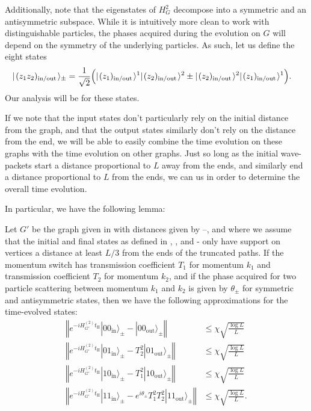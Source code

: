 \documentclass[../thesis-main/thesis-main]{subfiles}
\begin{document}
Additionally, note that the eigenstates of $H_G^2$ decompose into a symmetric and an antisymmetric subspace.  While it is intuitively more clean to work with distinguishable particles, the phases acquired during the evolution on $G$ will depend on the symmetry of the underlying particles.  As such, let us define the eight states
\begin{align}
  |\mspace{2mu} (z_1z_2)_{\text{in/out}} \mspace{2mu} \rangle_{\pm} &= \frac{1}{\sqrt{2} }\Big(|\mspace{2mu} (z_1)_{\text{in/out}} \mspace{2mu} \rangle^1 |\mspace{2mu} (z_{2})_{\text{in/out}} \mspace{2mu} \rangle^2 \pm |\mspace{2mu} (z_{2})_{\text{in/out}} \mspace{2mu} \rangle^2|\mspace{2mu} (z_1)_{\text{in/out}} \mspace{2mu} \rangle^1 \Big).
\end{align}
Our analysis will be for these states.

If we note that the input states don't particularly rely on the initial distance from the graph, and that the output states similarly don't rely on the distance from the end, we will be able to easily combine the time evolution on these graphs with the time evolution on other graphs.  Just so long as the initial wave-packets start a distance proportional to $L$ away from the ends, and similarly end a distance proportional to $L$ from the ends, we can us  in order to determine the overall time evolution.

In particular, we have the following lemma:
\begin{lemma}
Let $G'$ be the graph given in  with distances given by --, and where we assume that the initial and final states as defined in , , and - only have support on vertices a distance at least $L/3$ from the ends of the truncated paths.  If the momentum switch has transmission coefficient $T_1$ for momentum $k_1$ and transmission coefficient $T_2$ for momentum $k_2$, and if the phase acquired for two particle scattering between momentum $k_1$ and $k_2$ is given by $\theta_{\pm}$ for symmetric and antisymmetric states, then we have the following approximations for the time-evolved states:
\begin{align}
  \left\Vert e^{-iH_{G'}^{(2)}t_{\mathrm{II}}}|00_{\text{in}}\rangle_{\pm}-|00_{\text{out}}\rangle_{\pm} \right\Vert  & \leq \chi \sqrt{\frac{\log L}{L}}\label{eq:bound00}\\
  \left\Vert e^{-iH_{G'}^{(2)}t_{\mathrm{II}}}|01_{\text{in}}\rangle_{\pm}-T_{2}^2|01_{\text{out}}\rangle_{\pm}\right\Vert  & \leq \chi \sqrt{\frac{\log L}{L}}\label{eq:bound01}\\
  \left\Vert e^{-iH_{G'}^{(2)}t_{\mathrm{II}}}|10_{\text{in}}\rangle_{\pm}-T_1^2|10_{\text{out}}\rangle_{\pm}\right\Vert  & \leq\chi \sqrt{\frac{\log L}{L}}\label{eq:bound10}\\
  \left\Vert e^{-iH_{G'}^{(2)}t_{\mathrm{II}}}|11_{\text{in}}\rangle_{\pm} - e^{i\theta_{\pm}}T_1^2T_2^2|11_{\text{out}}\rangle_{\pm}\right\Vert  & \leq\chi \sqrt{\frac{\log L}{L}}.\label{eq:bound11}
\end{align}
\label{lem:cd_bounds}
\end{lemma}
\end{document}
